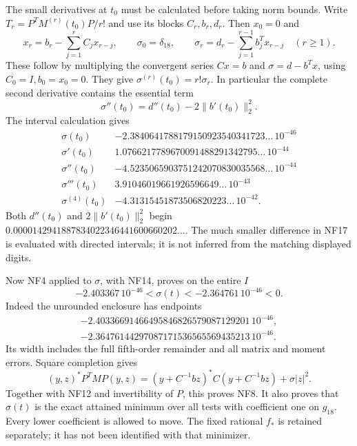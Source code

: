 The small derivatives at $t_0$ must be calculated before taking
norm bounds. Write $T_r=P^TM^{(r)}(t_0)P/r!$ and use its blocks
$C_r,b_r,d_r$. Then $x_0=0$ and
\[
 x_r=b_r-\sum_{j=1}^r C_jx_{r-j},\qquad
 \sigma_0=\delta_{18},\qquad
 \sigma_r=d_r-\sum_{j=1}^{r-1}b_j^Tx_{r-j}\quad(r\ge1).
 \tag{NF15}
\]
These follow by multiplying the convergent series $Cx=b$ and
$\sigma=d-b^Tx$, using $C_0=I,b_0=x_0=0$.
They give $\sigma^{(r)}(t_0)=r!\sigma_r$. In particular the
complete second derivative contains the essential term
\[
 \sigma''(t_0)=d''(t_0)-2\|b'(t_0)\|_2^2.
 \tag{NF16}
\]
The interval calculation gives
\[
\begin{array}{c|l}
\sigma(t_0)&-2.3840641788179150923540341723\ldots\,10^{-46}\\
\sigma'(t_0)&1.0766217789670091488291342795\ldots\,10^{-44}\\
\sigma''(t_0)&-4.5235065903751242070830035568\ldots\,10^{-44}\\
\sigma'''(t_0)&3.91046019661926596649\ldots\,10^{-43}\\
\sigma^{(4)}(t_0)&-4.31315451873506820223\ldots\,10^{-42}.
\end{array}\tag{NF17}
\]
Both $d''(t_0)$ and $2\|b'(t_0)\|_2^2$ begin
$0.0000142941887834022346441600660202\ldots$.
The much smaller difference in NF17 is evaluated with directed
intervals; it is not inferred from the matching displayed digits.

Now NF4 applied to $\sigma$, with NF14, proves on the entire $I$
\[
 -2.403367\,10^{-46}<\sigma(t)<-2.364761\,10^{-46}<0.
 \tag{NF18}
\]
Indeed the unrounded enclosure has endpoints
\[
\begin{aligned}
-2.40336691466495846826579087129201\,10^{-46},\\
-2.36476144297087171536565569435213\,10^{-46}.
\end{aligned}
\]
Its width includes the full fifth-order remainder and all matrix
and moment errors. Square completion gives
\[
 (y,z)^*P^TMP(y,z)
 =(y+C^{-1}bz)^*C(y+C^{-1}bz)+\sigma|z|^2.
 \tag{NF19}
\]
Together with NF12 and invertibility of $P$, this proves NF8.
It also proves that $\sigma(t)$ is the exact attained minimum
over all tests with coefficient one on $g_{18}$. Every lower
coefficient is allowed to move. The fixed rational $f_*$ is
retained separately; it has not been identified with that
minimizer.

